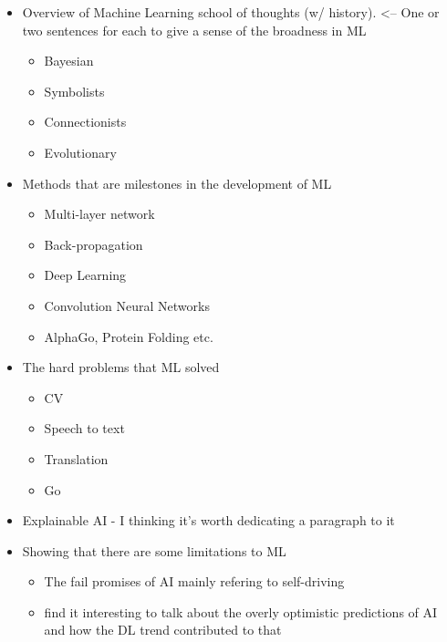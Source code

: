 \begin{itemize}
\item Overview of Machine Learning school of thoughts (w/ history).  <-- One or two sentences for each to give a sense of the broadness in ML
  \begin{itemize}
    \item Bayesian
    \item Symbolists 
    \item Connectionists 
    \item Evolutionary 
  \end{itemize}
\item Methods that are milestones in the development of ML
    \begin{itemize}
      \item Multi-layer network 
      \item Back-propagation 
      \item Deep Learning 
      \item Convolution Neural Networks
      \item AlphaGo, Protein Folding etc. 
    \end{itemize}
\item The hard problems that ML solved
    \begin{itemize}
      \item CV
      \item Speech to text
      \item Translation
      \item Go 
    \end{itemize}
\item Explainable AI - I thinking it’s worth dedicating a paragraph to it
\item Showing that there are some limitations to ML
\begin{itemize}
  \item The fail promises of AI mainly refering to self-driving
  \item find it interesting to talk about the overly optimistic predictions of AI and how the DL trend contributed to that
  \end{itemize}
\end{itemize}

